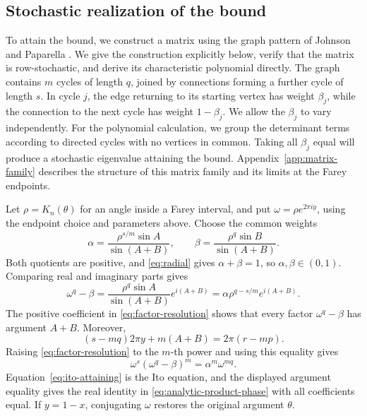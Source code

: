 \documentclass[11pt,a4paper]{article}
\theoremstyle{definition}
\theoremstyle{remark}
\numberwithin{equation}{section}
\begin{document}

\subsection{Stochastic realization of the bound}
To attain the bound, we construct a matrix using the graph pattern of Johnson and Paparella \cite[Theorem~3.2]{JP}. We give the construction explicitly below, verify that the matrix is row-stochastic, and derive its characteristic polynomial directly. The graph contains $m$ cycles of length $q$, joined by connections forming a further cycle of length $s$. In cycle $j$, the edge returning to its starting vertex has weight $\beta_j$, while the connection to the next cycle has weight $1-\beta_j$. We allow the $\beta_j$ to vary independently. For the polynomial calculation, we group the determinant terms according to directed cycles with no vertices in common. Taking all $\beta_j$ equal will produce a stochastic eigenvalue attaining the bound. Appendix~\ref{app:matrix-family} describes the structure of this matrix family and its limits at the Farey endpoints.

Let $\rho=K_n(\theta)$ for an angle inside a Farey interval, and put $\omega=\rho e^{2\pi i y}$, using the endpoint choice and parameters above. Choose the common weights
\begin{equation}\label{eq:equal-parameters}
 \alpha=\frac{\rho^{s/m}\sin A}{\sin(A+B)},\qquad
 \beta=\frac{\rho^q\sin B}{\sin(A+B)}.
\end{equation}
Both quotients are positive, and \eqref{eq:radial} gives $\alpha+\beta=1$, so $\alpha,\beta\in(0,1)$. Comparing real and imaginary parts gives
\begin{equation}\label{eq:factor-resolution}
 \omega^q-\beta
   =\frac{\rho^q\sin A}{\sin(A+B)}e^{i(A+B)}
   =\alpha\rho^{q-s/m}e^{i(A+B)}.
\end{equation}
The positive coefficient in \eqref{eq:factor-resolution} shows that every factor $\omega^q-\beta$ has argument $A+B$. Moreover,
\[
 (s-mq)2\pi y+m(A+B)=2\pi(r-mp).
\]
Raising \eqref{eq:factor-resolution} to the $m$-th power and using this equality gives
\begin{equation}\label{eq:ito-attaining}
 \omega^s(\omega^q-\beta)^m=\alpha^m\omega^{mq}.
\end{equation}
Equation~\eqref{eq:ito-attaining} is the Ito equation, and the displayed argument equality gives the real identity in \eqref{eq:analytic-product-phase} with all coefficients equal. If $y=1-x$, conjugating $\omega$ restores the original argument $\theta$.
\end{document}
